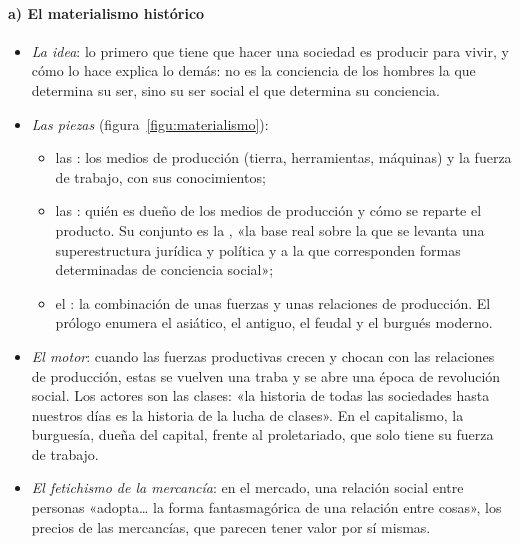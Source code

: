 \documentclass[11pt]{article}
\begin{document}
\paragraph{a) El materialismo histórico}
\begin{itemize}
\item \emph{La idea}: lo primero que tiene que hacer una sociedad es producir para vivir, y cómo lo hace explica lo demás: no es la conciencia de los hombres la que determina su ser, sino su ser social el que determina su conciencia\nocite{Marx1859Kritik}.
\item \emph{Las piezas} (figura~\ref{figu:materialismo}):
  \begin{itemize}
  \item las : los medios de producción (tierra, herramientas, máquinas) y la fuerza de trabajo, con sus conocimientos;
  \item las : quién es dueño de los medios de producción y cómo se reparte el producto. Su conjunto es la , «la base real sobre la que se levanta una superestructura jurídica y política y a la que corresponden formas determinadas de conciencia social»\nocite{Marx1859Kritik};
  \item el : la combinación de unas fuerzas y unas relaciones de producción. El prólogo enumera el asiático, el antiguo, el feudal y el burgués moderno.
  \end{itemize}
\item \emph{El motor}: cuando las fuerzas productivas crecen y chocan con las relaciones de producción, estas se vuelven una traba y se abre una época de revolución social. Los actores son las clases: «la historia de todas las sociedades hasta nuestros días es la historia de la lucha de clases»\nocite{MarxEngels1848Manifest}. En el capitalismo, la burguesía, dueña del capital, frente al proletariado, que solo tiene su fuerza de trabajo.
\item \emph{El fetichismo de la mercancía}: en el mercado, una relación social entre personas «adopta… la forma fantasmagórica de una relación entre cosas», los precios de las mercancías, que parecen tener valor por sí mismas\nocite{Marx1867Kapital}.
\end{itemize}
\begin{infografia}[H]
\centering
\caption{El materialismo histórico}\label{figu:materialismo}
\end{infografia}
\end{document}

